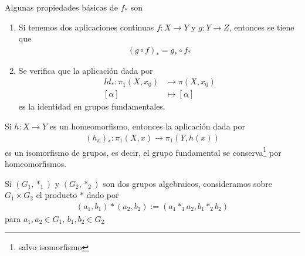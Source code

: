 \begin{propiedades}
    Algunas propiedades básicas de $f_*$ son
    \begin{enumerate}
        \item Si tenemos dos aplicaciones continuas $f:X\to Y$ y $g:Y \to Z$, entonces se tiene que 
        \begin{gather*}
            (g\circ f)_* = g_* \circ f_*
        \end{gather*}

        \item  Se verifica que la aplicación dada por
        \begin{align*}
            Id_*: \pi_1(X,x_0) &\to \pi(X,x_0)\\
            [\alpha] & \mapsto [\alpha]
        \end{align*}
        es la identidad en grupos fundamentales.
    \end{enumerate}
\end{propiedades}

\begin{coro}
    Si $h:X\to Y$ es un homeomorfismo, entonces la aplicación dada por
    \begin{gather*}
        (h_x)_*:\pi_1(X,x) \to \pi_1(Y,h(x))
    \end{gather*}
    es un isomorfismo de grupos, es decir, el grupo fundamental se conserva\footnote{salvo isomorfismo} por homeomorfismos.
\end{coro}

\begin{definicion}
    Si $(G_1,\ast_1)$ y $(G_2, \ast_2)$ son dos grupos algebraicos, consideramos sobre $G_1\times G_2$ el producto $\ast$ dado por 
    \begin{gather*}
        (a_1,b_1)\ast(a_2,b_2) := (a_1\ast_1 a_2, b_1 \ast_2 b_2)
    \end{gather*}
    para $a_1,a_2\in G_1$, $b_1,b_2\in G_2$
\end{definicion}

